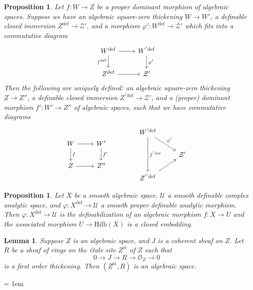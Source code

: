 \documentclass{amsart}
\newtheorem{lemma}[theorem]{Lemma}
\newtheorem{proposition}[theorem]{Proposition}
\theoremstyle{definition}
\numberwithin{equation}{section}
\newcommand{\definable}{\mathrm{def}}
\begin{document}
\begin{proposition}
    Let $f: W \to Z$ be a proper dominant morphism of algebraic spaces.
    Suppose we have an algebraic square-zero thickening
    $W \to W'$, a definable closed immersion $Z^{\definable} \to \mathcal{Z}'$,
    and a morphism $\varphi': W^{\definable}\to \mathcal{Z}'$ which fits into a commutative diagram
    \[\begin{tikzcd}
        W^{\definable} \ar[r]\ar[d,"f^{\definable}"'] & W^{'\definable}\ar[d,"\varphi'"] \\
        Z^{\definable} \ar[r] & \mathcal{Z}'
    \end{tikzcd}\]
    Then the following are uniquely defined:
    an algebraic square-zero thickening
    $Z \to Z''$,
    a definable closed immersion $Z^{''\definable} \to \mathcal{Z}'$,
    and a (proper) dominant morphism $f': W' \to Z''$ of algebraic spaces,
    such that we have commutative diagrams
    \[
    \begin{tikzcd}
        W\ar[r]\ar[d,"f"] & W'\ar[d,"f'"] \\
        Z \ar[r] & Z''
    \end{tikzcd}
    \hspace{40pt}
    \begin{tikzcd}
        W^{'\definable}\ar[dd,"f^{'\definable}"]\ar[rd,"\varphi'"] & \\
        & \mathcal{Z}' \\
        Z^{''\definable}\ar[ur] &
    \end{tikzcd}
    \]
\end{proposition}

\begin{proposition}
    Let $X$ be a smooth algebraic space,
    $\mathcal{U}$ a smooth definable complex analytic space,
    and $\varphi: X^{\definable} \to \mathcal{U}$ a smooth proper definable analytic morphism.
    Then $\varphi: X^{\definable} \to \mathcal{U}$ is the definabilization of an algebraic morphism $f: X \to U$ and 
    the associated morphism $U \to \mathrm{Hilb}(X)$ is a closed embedding.
\end{proposition}

\begin{lemma}
    Suppose $Z$ is an algebraic space,
    and $J$ is a coherent sheaf on $Z$.
    Let $R$ be a sheaf of rings on the {\'e}tale site $Z^{\text{\' et}}$ of $Z$ such that 
    \[
    0 \to J \to R \to \mathcal{O}_Z \to 0
    \]
    is a first order thickening.
    Then $(Z^{\text{\'et}},R)$ is an algebraic space.
\end{lemma}

\emergencystretch = 1em
\printbibliography
\end{document}
